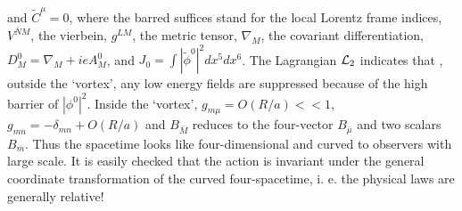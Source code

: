 \documentclass[a4paper,12pt]{article}
\begin{document}
and $\widetilde C^\mu=0$, where the barred suffices stand for the local Lorentz frame indices,
$V^{\bar N M}$, the vierbein, $g^{LM}$, the metric tensor,
$\nabla_M$, the covariant differentiation, $D_M^0=\nabla_M+ieA_M^0$, 
and $J_0=\int|\widetilde\phi^0|^2dx^5dx^6$.
The Lagrangian ${\cal L}_2$ indicates that , outside the `vortex', any low energy fields are suppressed
because of the high barrier of $|\phi^0|^2$.
Inside the `vortex', $g_{m\mu}=O(R/a)<<1$, $g_{mn}=-\delta_{mn}+O(R/a)$ and 
$B_{\bar M}$ reduces to the four-vector $B_{\bar\mu}$ and two scalars $B_{\bar m}$.
Thus the spacetime looks like four-dimensional and curved to observers with large scale.
It is easily checked that the action is invariant under the general coordinate transformation
of the curved four-spacetime, i. e. the physical laws are generally relative!
\end{document}
